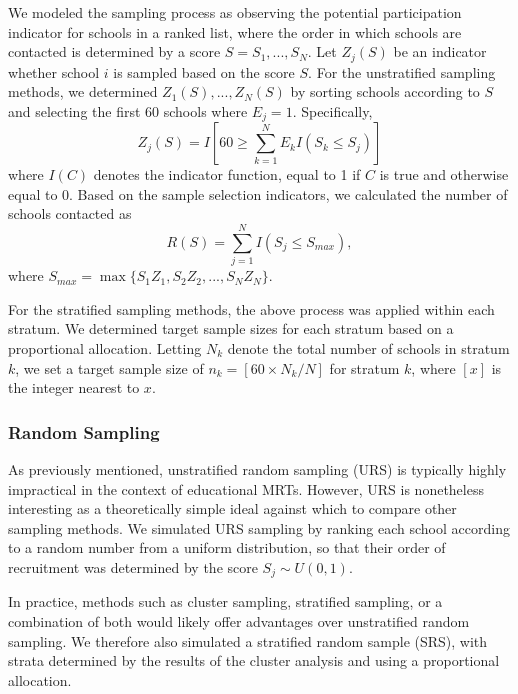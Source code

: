 \documentclass[man,floatsintext]{apa6}
\begin{document}
We modeled the sampling process as observing the potential participation indicator for schools in a ranked list, where the order in which schools are contacted is determined by a score \(S = S_1,...,S_N\). Let \(Z_j(S)\) be an indicator whether school \(i\) is sampled based on the score \(S\).
For the unstratified sampling methods, we determined \(Z_1(S),...,Z_N(S)\) by sorting schools according to \(S\) and selecting the first 60 schools where \(E_j = 1\).
Specifically,
\begin{equation}
\label{eq:Zj}
Z_j(S) = I\left[60 \geq \sum_{k=1}^N E_k I\left(S_k \leq S_j\right)\right]
\end{equation}
where \(I(C)\) denotes the indicator function, equal to 1 if \(C\) is true and otherwise equal to 0. Based on the sample selection indicators, we calculated the number of schools contacted as
\begin{equation}
\label{eq:R}
R(S) = \sum_{j=1}^N I(S_j \leq S_{max}),
\end{equation}
where \(S_{max} = \max \{S_1 Z_1, S_2 Z_2, ..., S_N Z_N\}\).

For the stratified sampling methods, the above process was applied within each stratum. We determined target sample sizes for each stratum based on a proportional allocation. Letting \(N_k\) denote the total number of schools in stratum \(k\), we set a target sample size of \(n_k = [60 \times N_k / N]\) for stratum \(k\), where \([x]\) is the integer nearest to \(x\).

\hypertarget{random-sampling}{%
\subsubsection{Random Sampling}\label{random-sampling}}

As previously mentioned, unstratified random sampling (URS) is typically highly impractical in the context of educational MRTs. However, URS is nonetheless interesting as a theoretically simple ideal against which to compare other sampling methods. We simulated URS sampling by ranking each school according to a random number from a uniform distribution, so that their order of recruitment was determined by the score \(S_j \sim U(0, 1)\).

In practice, methods such as cluster sampling, stratified sampling, or a combination of both would likely offer advantages over unstratified random sampling. We therefore also simulated a stratified random sample (SRS), with strata determined by the results of the cluster analysis and using a proportional allocation.
\end{document}
